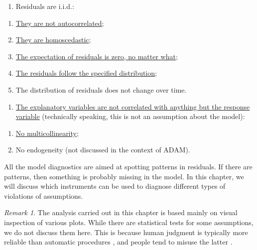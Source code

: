 \documentclass[
]{book}
\providecommand{\tightlist}{%
  \setlength{\itemsep}{0pt}\setlength{\parskip}{0pt}}
\theoremstyle{definition}
\theoremstyle{definition}
\theoremstyle{definition}
\theoremstyle{definition}
\theoremstyle{remark}
\newtheorem*{remark}{Remark}
\begin{document}
\begin{enumerate}
\def\labelenumi{\arabic{enumi}.}
\setcounter{enumi}{1}
\tightlist
\item
  Residuals are i.i.d.:
\end{enumerate}

\begin{enumerate}
\def\labelenumi{\alph{enumi}.}
\tightlist
\item
  \protect\hyperlink{diagnosticsResidualsIIDAuto}{They are not autocorrelated};
\item
  \protect\hyperlink{diagnosticsResidualsIIDHetero}{They are homoscedastic};
\item
  \protect\hyperlink{diagnosticsResidualsIIDExpectation}{The expectation of residuals is zero, no matter what};
\item
  \protect\hyperlink{diagnosticsResidualsIIDDistribution}{The residuals follow the specified distribution};
\item
  The distribution of residuals does not change over time.
\end{enumerate}

\begin{enumerate}
\def\labelenumi{\arabic{enumi}.}
\setcounter{enumi}{2}
\tightlist
\item
  \protect\hyperlink{diagnosticsMulticollinearity}{The explanatory variables are not correlated with anything but the response variable} (technically speaking, this is not an assumption about the model):
\end{enumerate}

\begin{enumerate}
\def\labelenumi{\alph{enumi}.}
\tightlist
\item
  \protect\hyperlink{diagnosticsMulticollinearity}{No multicollinearity};
\item
  No endogeneity (not discussed in the context of ADAM).
\end{enumerate}

All the model diagnostics are aimed at spotting patterns in residuals. If there are patterns, then something is probably missing in the model. In this chapter, we will discuss which instruments can be used to diagnose different types of violations of assumptions.

\begin{remark}
The analysis carried out in this chapter is based mainly on visual inspection of various plots. While there are statistical tests for some assumptions, we do not discuss them here. This is because human judgment is typically more reliable than automatic procedures \citep{Petropoulos2018a}, and people tend to misuse the latter \citep{Wasserstein2016}.
\end{remark}
\end{document}

